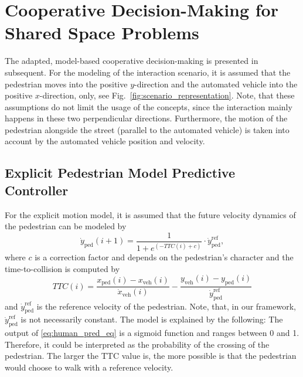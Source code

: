 \documentclass[conference]{IEEEtran}
\newcommand{\rr}[1]{\textcolor{red}{#1}}
\begin{document}
	
	\section{Cooperative Decision-Making for Shared Space Problems} \label{sec:SC-Concept}
	The adapted, model-based cooperative decision-making is presented in subsequent. For the modeling of the interaction scenario, it is assumed that the pedestrian moves into the positive $y$-direction and the automated vehicle into the positive $x$-direction, only, see Fig.~\ref{fig:scenario_representation}. Note, that these assumptions do not limit the usage of the concepts, since the interaction mainly happens in these two perpendicular directions. Furthermore, the motion of the pedestrian alongside the street (parallel to the automated vehicle) is taken into account by the automated vehicle position and velocity. 
	
	\subsection{Explicit Pedestrian Model Predictive Controller}
	For the explicit motion model, it is assumed that the future velocity dynamics of the pedestrian can be modeled by 
	\begin{equation} \label{eq:human_pred_eq}
		\dot{y}_\mathrm{ped}(i+1) = \frac{1}{1 + e^{(-TTC(i)+c)}} \cdot \dot y_\mathrm{ped}^\mathrm{ref},
	\end{equation}
	where $c$ is a correction factor and depends on the pedestrian's character and the time-to-collision is computed by
	\begin{equation}
		TTC(i) = \frac{x_\mathrm{ped}(i) - x_\mathrm{veh}(i)}{\dot x_\mathrm{veh}(i)} - 
		\frac{y_\mathrm{veh}(i) - y_\mathrm{ped}(i)}{\dot y_\mathrm{ped}^\mathrm{ref}}
	\end{equation}
	and $\dot y_\mathrm{ped}^\mathrm{ref}$ is the reference velocity of the pedestrian. Note, that, in our framework, $\dot y_\mathrm{ped}^\mathrm{ref}$ is not necessarily constant. The model is explained by the following: The output of \eqref{eq:human_pred_eq} is a sigmoid function and ranges between 0 and 1. Therefore, it could be interpreted as the probability of the crossing of the pedestrian. The larger the TTC value is, the more possible is that the pedestrian would choose to walk with a reference velocity.
	
\end{document}
